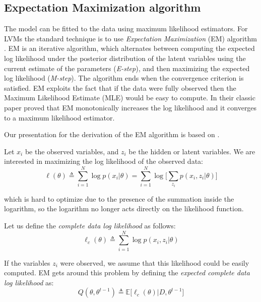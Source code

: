 \subsection{Expectation Maximization algorithm}
The model can be fitted to the data using maximum likelihood estimators. For LVMs the standard technique is to use \emph{Expectation Maximization} (EM) algorithm \citep{Dempster1977}. EM is an iterative algorithm, which alternates between computing the expected log likelihood under the posterior distribution of the latent variables using the current estimate of the parameters (\emph{E-step}), and then maximizing the expected log likelihood (\emph{M-step}). The algorithm ends when the convergence criterion is satisfied. EM exploits the fact that if the data were fully observed then the Maximum Likelihood Estimate (MLE) would be easy to compute. In their classic paper \cite{Dempster1977} proved that EM monotonically increases the log likelihood and it converges to a maximum likelihood estimator. 

Our presentation for the derivation of the EM algorithm is based on \cite[Ch. \ 11]{Murphy2012}.

Let $x_{i}$ be the observed variables, and $z_{i}$ be the hidden or latent variables. We are interested in maximizing the log likelihood of the observed data:
\begin{equation} \label{log-lik-observed-f}
	\ell(\theta) \triangleq \sum_{i=1}^{N} \log p(x_{i}|\theta) =  \sum_{i=1}^{N} \log \bigg[\sum_{z_{i}} p(x_{i}, z_{i}|\theta) \bigg]
\end{equation}

which is hard to optimize due to the presence of the summation inside the logarithm, so the logarithm no longer acts directly on the likelihood function.

Let us define the \emph{complete data log likelihood} as follows:
\begin{equation} \label{log-lik-observed-f}
	\ell_{c}(\theta) \triangleq \sum_{i=1}^{N} \log p(x_{i}, z_{i}|\theta)
\end{equation}

If the variables $z_{i}$ were observed, we assume that this likelihood could be easily computed. EM gets around this problem by defining the \emph{expected complete data log likelihood} as:
\begin{equation} \label{log-lik-expected-f}
		Q(\theta, \theta^{t-1}) \triangleq \mathbb{E} \big[\ell_{c}(\theta) | D, \theta^{t-1}\big]
\end{equation}

